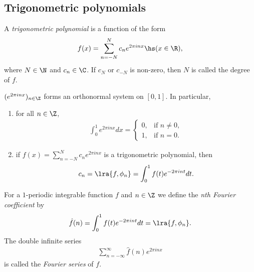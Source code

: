 \documentclass{article}
\begin{document}
\subsection{Trigonometric polynomials}

\begin{definition}
    A \emph{trigonometric polynomial} is a function of the form
    \begin{align*}
        f(x) = \sum_{n=-N}^N c_ne^{2\pi i n x} \hs (x\in\R),
    \end{align*}
    where $N\in\N$ and $c_n\in\C$. If $c_N$ or $c_{-N}$ is non-zero, then $N$ is called the
    degree of $f$.
\end{definition}

\begin{lemma}[Notes 5.1]
    $(e^{2\pi inx})_{n\in\Z}$ forms an orthonormal system on $[0,1]$. In particular,
    \begin{enumerate}
        \item for all $n\in\Z$, \begin{align*}
                  \int_0^1 e^{2\pi inx}dx = \begin{cases}
                      0, & \text{if }n\not=0, \\
                      1, & \text{if }n=0.
                  \end{cases}
              \end{align*}
        \item if $f(x)=\sum_{n=-N}^N c_ne^{2\pi inx}$ is a trigonometric polynomial, then \begin{align*}
                  c_n = \lra{f,\phi_n} = \int_0^1 f(t)e^{-2\pi int}dt.
              \end{align*}
    \end{enumerate}
\end{lemma}

\begin{definition}
    For a $1$-periodic integrable function $f$ and $n\in\Z$ we define the \emph{nth Fourier coefficient}
    by
    \begin{align*}
        \hat f(n) = \int_0^1 f(t)e^{-2\pi int}dt=\lra{f, \phi_n}.
    \end{align*}
    The double infinite series
    \begin{align*}
        \sum_{n=-\infty}^\infty \hat f(n) e^{2\pi inx}
    \end{align*}
    is called the \emph{Fourier series} of $f$.
\end{definition}
\end{document}
